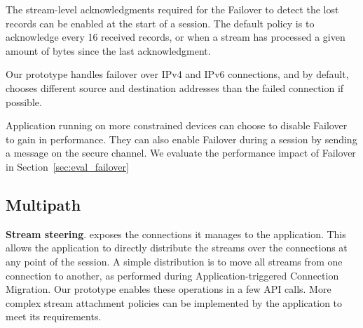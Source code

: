 The stream-level acknowledgments required for the Failover to detect the lost
\tcpls records can be enabled at the start of a \tcpls session. The default
policy is to acknowledge every 16 received records, or when a
stream has processed
a given amount of
bytes since the last acknowledgment.

Our prototype handles failover over IPv4 and IPv6 \tcp connections, and by default, chooses different source and destination addresses than the failed \tcp connection if possible.

Application running on more constrained devices can choose to disable Failover
to gain in performance. They can also enable Failover during a \tcpls session
by sending a message on the secure channel.
We evaluate the performance impact of Failover in
Section~\ref{sec:eval_failover}


\subsection{Multipath}
\label{sec:prot-multipath}

\textbf{Stream steering}.
\tcpls exposes the \tcp connections it manages to the application. This allows
the application to directly distribute the \tcpls streams over the \tcp
connections at any point of the \tcpls session. A simple distribution is to
move all \tcpls streams from one connection to another, as performed during
Application-triggered Connection Migration. Our prototype enables these
operations in a few API calls. More complex stream attachment policies can be
implemented by the application to meet its requirements.

